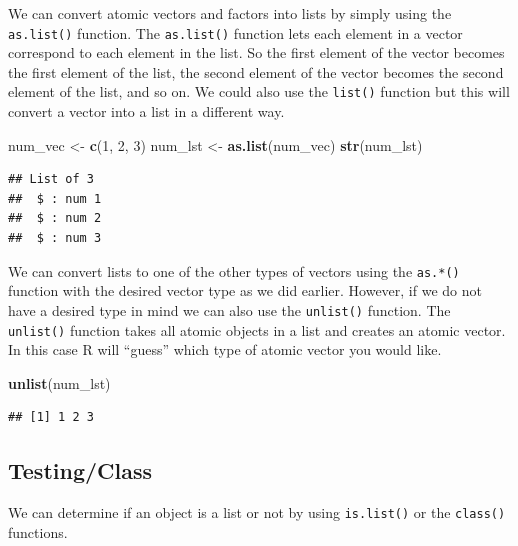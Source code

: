 \documentclass[
]{book}
\newenvironment{Shaded}{\begin{snugshade}}{\end{snugshade}}
\newcommand{\DecValTok}[1]{\textcolor[rgb]{0.00,0.00,0.81}{#1}}
\newcommand{\KeywordTok}[1]{\textcolor[rgb]{0.13,0.29,0.53}{\textbf{#1}}}
\newcommand{\NormalTok}[1]{#1}
\newcommand{\StringTok}[1]{\textcolor[rgb]{0.31,0.60,0.02}{#1}}
\begin{document}
We can convert atomic vectors and factors into lists by simply using the \texttt{as.list()} function. The \texttt{as.list()} function lets each element in a vector correspond to each element in the list. So the first element of the vector becomes the first element of the list, the second element of the vector becomes the second element of the list, and so on. We could also use the \texttt{list()} function but this will convert a vector into a list in a different way.

\begin{Shaded}
\begin{Highlighting}[]
\NormalTok{num_vec <-}\StringTok{ }\KeywordTok{c}\NormalTok{(}\DecValTok{1}\NormalTok{, }\DecValTok{2}\NormalTok{, }\DecValTok{3}\NormalTok{)}
\NormalTok{num_lst <-}\StringTok{ }\KeywordTok{as.list}\NormalTok{(num_vec)}
\KeywordTok{str}\NormalTok{(num_lst)}
\end{Highlighting}
\end{Shaded}

\begin{verbatim}
## List of 3
##  $ : num 1
##  $ : num 2
##  $ : num 3
\end{verbatim}

We can convert lists to one of the other types of vectors using the \texttt{as.*()} function with the desired vector type as we did earlier. However, if we do not have a desired type in mind we can also use the \texttt{unlist()} function. The \texttt{unlist()} function takes all atomic objects in a list and creates an atomic vector. In this case R will ``guess'' which type of atomic vector you would like.

\begin{Shaded}
\begin{Highlighting}[]
\KeywordTok{unlist}\NormalTok{(num_lst)}
\end{Highlighting}
\end{Shaded}

\begin{verbatim}
## [1] 1 2 3
\end{verbatim}

\hypertarget{testingclass-1}{%
\subsection{Testing/Class}\label{testingclass-1}}

We can determine if an object is a list or not by using \texttt{is.list()} or the \texttt{class()} functions.
\end{document}
